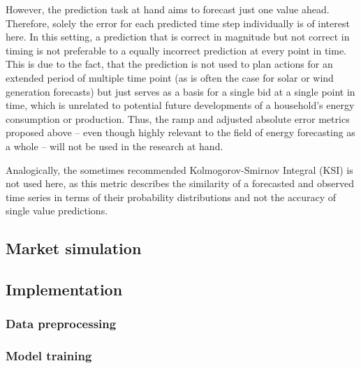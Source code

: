 However, the prediction task at hand aims to forecast just one value ahead. Therefore, solely the error for each predicted time step individually is of interest here. In this setting, a prediction that is correct in magnitude but not correct in timing is not preferable to a equally incorrect prediction at every point in time. This is due to the fact, that the prediction is not used to plan actions for an extended period of multiple time point (as is often the case for solar or wind generation forecasts) but just serves as a basis for a single bid at a single point in time, which is unrelated to potential future developments of a household's energy consumption or production. Thus, the ramp and adjusted absolute error metrics proposed above -- even though highly relevant to the field of energy forecasting as a whole -- will not be used in the research at hand.

Analogically, the sometimes recommended Kolmogorov-Smirnov Integral (KSI) \citep{Espinar:2009} is not used here, as this metric describes the similarity of a forecasted and observed time series in terms of their probability distributions and not the accuracy of single value predictions.




\subsection{Market simulation} \label{Sec:Method;Subsec:Market}






\subsection{Implementation} \label{Sec:Method;Subsec:Implementation}


\subsubsection{Data preprocessing}

\subsubsection{Model training}

